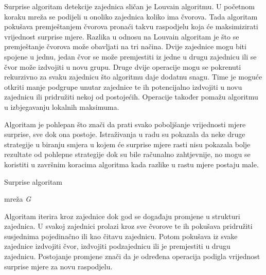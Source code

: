 Surprise algoritam detekcije zajednica sličan je Louvain algoritmu. U početnom koraku mreža se podijeli u onoliko zajednica koliko ima čvorova. Tada algoritam pokušava premještanjem čvorova pronaći takvu raspodjelu koja će maksimizirati vrijednost surprise mjere. Razlika u odnosu na Louvain algoritam je što se premještanje čvorova može obavljati na tri načina. Dvije zajednice mogu biti spojene u jednu, jedan čvor se može premjestiti iz jedne u drugu zajednicu ili se čvor može izdvojiti u novu grupu. Druge dvije operacije mogu se pokrenuti rekurzivno za svaku zajednicu što algoritmu daje dodatnu snagu. Time je moguće otkriti manje podgrupe unutar zajednice te ih potencijalno izdvojiti u novu zajednicu ili pridružiti nekoj od postojećih. Operacije također pomažu algoritmu u izbjegavanju lokalnih maksimuma.

Algoritam je pohlepan što znači da prati svako poboljšanje vrijednosti mjere surprise, sve dok ona postoje. Istraživanja u radu \cite{gamermann2022algorithm} su pokazala da neke druge strategije u biranju smjera u kojem će surprise mjere rasti nisu pokazala bolje rezultate od pohlepne strategije dok su bile računalno zahtjevnije, no mogu se koristiti u završnim koracima algoritma kada razlike u rastu mjere postaju male.


\begin{algorithm}
	\caption{Surprise algoritam}
	\begin{algorithmic}[1]
		\REQUIRE mreža \textit{G}
						\ENDIF
					\ENDFOR
				\ENDFOR 
				\ENDWHILE
				\ENDWHILE
					 \ENDFOR
				\ENDWHILE				
			\ENDFOR
		\ENDWHILE
	\end{algorithmic}
\end{algorithm}

Algoritam iterira kroz zajednice dok god se događaju promjene u strukturi zajednica. U svakoj zajednici prolazi kroz sve čvorove te ih pokušava pridružiti susjednima pojedinačno ili kao čitavu zajednicu. Potom pokušava iz svake zajednice izdvojiti čvor, izdvojiti podzajednicu ili je premjestiti u drugu zajednicu. Postojanje promjene znači da je određena operacija podigla vrijednost surprise mjere za novu raspodjelu.

